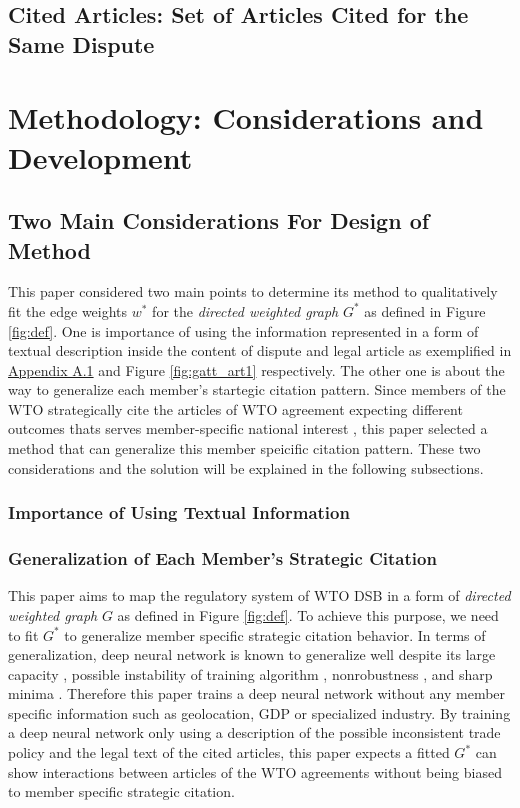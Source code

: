 \documentclass[12pt,letterpaper]{article}
\begin{document}
\subsection{Cited Articles: Set of Articles Cited for the Same Dispute}


\section{Methodology: Considerations and Development}


\subsection{Two Main Considerations For Design of Method}
This paper considered two main points to
determine its method to qualitatively fit the edge weights $w^*$ for the \textit{directed weighted graph} $G^*$ as defined in Figure \ref{fig:def}. One is importance of using the information represented in a form of textual description inside the content of dispute and legal article as exemplified in \hyperref[sub:factual-aspect-example]{Appendix A.1} and Figure {\ref{fig:gatt_art1}} respectively. The other one is about the way to generalize each member's startegic citation pattern. Since members of the WTO strategically cite
the articles of WTO agreement expecting different outcomes thats serves member-specific national interest \citep{who_gets, pelc, latent}, this paper
selected a method that can generalize this member speicific citation pattern. These two considerations and the solution will be explained in the following subsections.

\subsubsection{Importance of Using Textual Information}


\subsubsection{Generalization of Each Member's Strategic Citation}

This paper aims to map the regulatory system of WTO DSB in a form of \textit{directed weighted graph} $G$ as defined in Figure \ref{fig:def}.
To achieve this purpose, we need to fit $G^{*}$ to generalize member specific strategic citation behavior.
In terms of generalization, deep neural network is known to generalize well despite
its large capacity \citep{neyshabur2017exploring}, possible instability of training algorithm \citep{charles2017stability}, nonrobustness \citep{zahavy2017ensemble}, and sharp minima \citep{dinh2017sharp}.
Therefore this paper trains a deep neural network without any member specific information such as geolocation, GDP or specialized industry. By training a deep neural network only using a description of the possible inconsistent trade policy and the legal text of the cited articles,
this paper expects a fitted $G^{*}$ can show interactions between articles of the WTO agreements
without being biased to member specific strategic citation.
\end{document}
